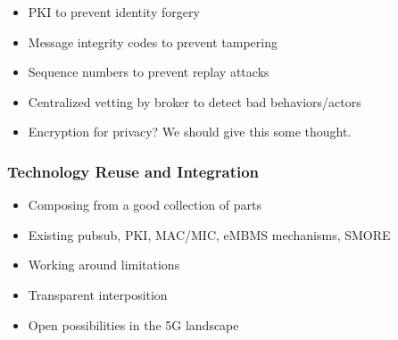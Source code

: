 \begin{itemize}
\item PKI to prevent identity forgery
\item Message integrity codes to prevent tampering
\item Sequence numbers to prevent replay attacks
\item Centralized vetting by broker to detect bad behaviors/actors
\item Encryption for privacy? We should give this some thought.
\end{itemize}

\subsubsection{Technology Reuse and Integration}

\begin{itemize}
\item Composing from a good collection of parts
\item Existing pubsub, PKI, MAC/MIC, eMBMS mechanisms, SMORE
\item Working around limitations
\item Transparent interposition
\item Open possibilities in the 5G landscape
\end{itemize}
